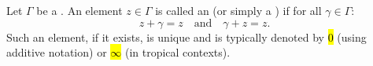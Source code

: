 \begin{definition} \label{definition:absorbing_zero_of_a_monoid}
Let $\Gamma$ be a . An element $z \in \Gamma$ is called an  (or simply a ) if for all $\gamma \in \Gamma$:
$$z + \gamma = z \quad \text{and} \quad \gamma + z = z.$$
Such an element, if it exists, is unique and is typically denoted by \hl{$0$} (using additive notation) or \hl{$\infty$} (in tropical contexts).
\end{definition}